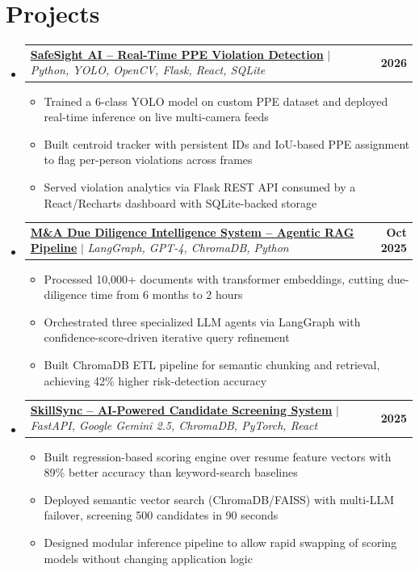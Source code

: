 \documentclass[letterpaper,11pt]{article}
\makeatletter
\newcommand{\resumeItem}[1]{
  \item\small{
    {#1 \vspace{-2pt}}
  }
}
\newcommand{\resumeProjectHeading}[2]{
    \item
    \begin{tabular*}{1.001\textwidth}{l@{\extracolsep{\fill}}r}
      \small#1 & \textbf{\small #2}\\
    \end{tabular*}\vspace{-7pt}
}
\newcommand{\resumeSubHeadingListStart}{\begin{itemize}[leftmargin=0.0in, label={}]}
\newcommand{\resumeSubHeadingListEnd}{\end{itemize}}
\newcommand{\resumeItemListStart}{\begin{itemize}}
\newcommand{\resumeItemListEnd}{\end{itemize}\vspace{-5pt}}
\makeatother
\begin{document}
\section{Projects}
    \resumeSubHeadingListStart
      \resumeProjectHeading
          {\textbf{\href{https://github.com/hiru-viru/safesight-ai}{SafeSight AI -- Real-Time PPE Violation Detection}} $|$ \emph{Python, YOLO, OpenCV, Flask, React, SQLite}}{2026}
          \resumeItemListStart
            \resumeItem{Trained a 6-class YOLO model on custom PPE dataset and deployed real-time inference on live multi-camera feeds}
            \resumeItem{Built centroid tracker with persistent IDs and IoU-based PPE assignment to flag per-person violations across frames}
            \resumeItem{Served violation analytics via Flask REST API consumed by a React/Recharts dashboard with SQLite-backed storage}
          \resumeItemListEnd 
          \vspace{-13pt}
      \resumeProjectHeading
          {\textbf{\href{https://github.com/HIRU-VIRU/M-A_analysis_rag}{M\&A Due Diligence Intelligence System -- Agentic RAG Pipeline}} $|$ \emph{LangGraph, GPT-4, ChromaDB, Python}}{Oct 2025}
          \resumeItemListStart
            \resumeItem{Processed 10,000+ documents with transformer embeddings, cutting due-diligence time from 6 months to 2 hours}
            \resumeItem{Orchestrated three specialized LLM agents via LangGraph with confidence-score-driven iterative query refinement}
            \resumeItem{Built ChromaDB ETL pipeline for semantic chunking and retrieval, achieving 42\% higher risk-detection accuracy}
          \resumeItemListEnd
          \vspace{-13pt}
      \resumeProjectHeading
          {\textbf{\href{https://github.com/HIRU-VIRU/skil-sync-fullstack}{SkillSync -- AI-Powered Candidate Screening System}} $|$ \emph{FastAPI, Google Gemini 2.5, ChromaDB, PyTorch, React}}{2025}
          \resumeItemListStart
            \resumeItem{Built regression-based scoring engine over resume feature vectors with 89\% better accuracy than keyword-search baselines}
            \resumeItem{Deployed semantic vector search (ChromaDB/FAISS) with multi-LLM failover, screening 500 candidates in 90 seconds}
            \resumeItem{Designed modular inference pipeline to allow rapid swapping of scoring models without changing application logic}
          \resumeItemListEnd 
          \vspace{-13pt}
    \resumeSubHeadingListEnd
\end{document}
